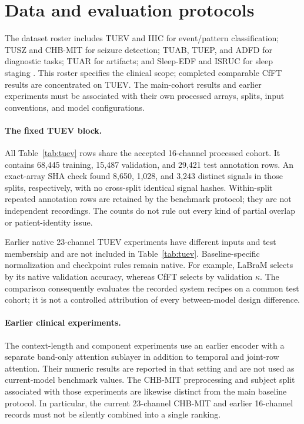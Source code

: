 \documentclass[10pt,twocolumn,letterpaper]{article}
\begin{document}
\section{Data and evaluation protocols}
\label{app:data}
The dataset roster includes TUEV and IIIC for event/pattern
classification; TUSZ and CHB-MIT for seizure detection; TUAB, TUEP,
and ADFD for diagnostic tasks; TUAR for artifacts; and Sleep-EDF and
ISRUC for sleep staging
\citep{obeid2016temple,shah2018temple,jing2023development,shoeb2009application,miltiadous2023dataset,kemp2000analysis,khalighi2016isruc}.
This roster specifies the clinical scope; completed comparable CfFT
results are concentrated on TUEV. The main-cohort results and
earlier experiments must be associated with their own processed arrays,
splits, input conventions, and model configurations.

\paragraph{The fixed TUEV block.}
All Table~\ref{tab:tuev} rows share the accepted 16-channel processed
cohort. It contains 68,445 training, 15,487 validation, and 29,421
test annotation rows. An exact-array SHA check found 8,650, 1,028,
and 3,243 distinct signals in those splits, respectively, with no
cross-split identical signal hashes. Within-split repeated annotation
rows are retained by the benchmark protocol; they are not independent
recordings. The counts do not rule out every kind of partial overlap
or patient-identity issue.

Earlier native 23-channel TUEV experiments have different inputs and
test membership and are not included in Table~\ref{tab:tuev}.
Baseline-specific normalization and checkpoint rules remain native.
For example, LaBraM selects by its native validation accuracy, whereas
CfFT selects by validation $\kappa$. The comparison consequently
evaluates the recorded system recipes on a common test cohort; it is
not a controlled attribution of every between-model design difference.

\paragraph{Earlier clinical experiments.}
The context-length and component experiments use an earlier encoder
with a separate band-only attention sublayer in addition to temporal
and joint-row attention. Their numeric results are reported in that
setting and are not used as current-model benchmark values.
The CHB-MIT preprocessing and subject split associated with those
experiments are likewise distinct from the main baseline protocol.
In particular, the current 23-channel CHB-MIT and earlier 16-channel
records must not be silently combined into a single ranking.
\end{document}
